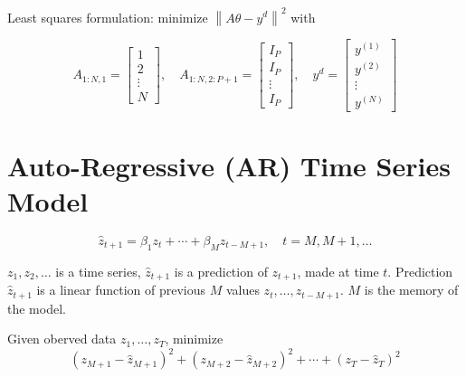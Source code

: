 \begin{problem}
    Least squares formulation: minimize $ \left\|A \theta-y^{{d}}\right\|^{2} $ with

\begin{equation} A_{1: N, 1}=\left[\begin{array}{c}1 \\ 2 \\ \vdots \\ N\end{array}\right], \quad A_{1: N, 2: P+1}=\left[\begin{array}{c}I_{P} \\ I_{P} \\ \vdots \\ I_{P}\end{array}\right], \quad y^{{d}}=\left[\begin{array}{c}y^{(1)} \\ y^{(2)} \\ \vdots \\ y^{(N)}\end{array}\right] \end{equation}
\end{problem}



\section{Auto-Regressive (AR) Time Series Model}

\begin{problem}
    \begin{equation}
\hat{z}_{t+1}=\beta_{1} z_{t}+\cdots+\beta_{M} z_{t-M+1}, \quad t=M, M+1, \ldots
\end{equation}

$ z_{1}, z_{2}, \ldots $ is a time series, $ \hat{z}_{t+1} $ is a prediction of $ z_{t+1} $, made at time $ t $. Prediction $ \hat{z}_{t+1} $ is a linear function of previous $ M $ values $ z_{t}, \ldots, z_{t-M+1} $. $ M $ is the memory of the model.
\end{problem}

\begin{problem}
    
    Given oberved data $ z_{1}, \ldots, z_{T} $, minimize
\begin{equation}
\left(z_{M+1}-\hat{z}_{M+1}\right)^{2}+\left(z_{M+2}-\hat{z}_{M+2}\right)^{2}+\cdots+\left(z_{T}-\hat{z}_{T}\right)^{2}
\end{equation}
\end{problem}


